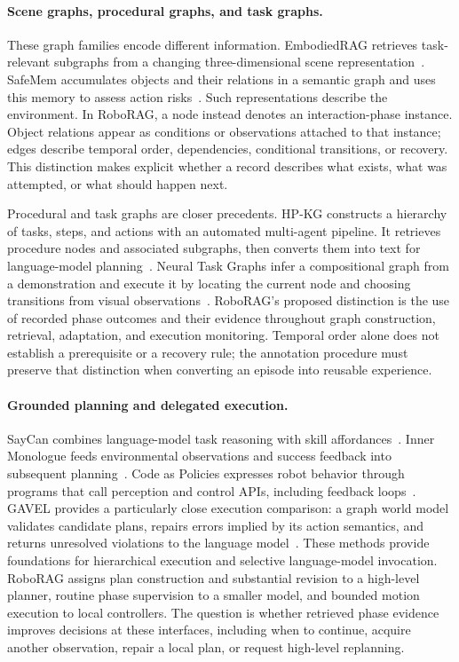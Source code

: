 \paragraph{Scene graphs, procedural graphs, and task graphs.}
These graph families encode different information. EmbodiedRAG retrieves task-relevant subgraphs from a changing three-dimensional scene representation~\cite{embodiedrag2024}. SafeMem accumulates objects and their relations in a semantic graph and uses this memory to assess action risks~\cite{safemem2026}. Such representations describe the environment. In RoboRAG, a node instead denotes an interaction-phase instance. Object relations appear as conditions or observations attached to that instance; edges describe temporal order, dependencies, conditional transitions, or recovery. This distinction makes explicit whether a record describes what exists, what was attempted, or what should happen next.

Procedural and task graphs are closer precedents. HP-KG constructs a hierarchy of tasks, steps, and actions with an automated multi-agent pipeline. It retrieves procedure nodes and associated subgraphs, then converts them into text for language-model planning~\cite{hpkg2025}. Neural Task Graphs infer a compositional graph from a demonstration and execute it by locating the current node and choosing transitions from visual observations~\cite{ntg2019}. RoboRAG's proposed distinction is the use of recorded phase outcomes and their evidence throughout graph construction, retrieval, adaptation, and execution monitoring. Temporal order alone does not establish a prerequisite or a recovery rule; the annotation procedure must preserve that distinction when converting an episode into reusable experience.

\paragraph{Grounded planning and delegated execution.}
SayCan combines language-model task reasoning with skill affordances~\cite{saycan2022}. Inner Monologue feeds environmental observations and success feedback into subsequent planning~\cite{innermonologue2022}. Code as Policies expresses robot behavior through programs that call perception and control APIs, including feedback loops~\cite{codepolicies2022}. GAVEL provides a particularly close execution comparison: a graph world model validates candidate plans, repairs errors implied by its action semantics, and returns unresolved violations to the language model~\cite{gavel2026}. These methods provide foundations for hierarchical execution and selective language-model invocation. RoboRAG assigns plan construction and substantial revision to a high-level planner, routine phase supervision to a smaller model, and bounded motion execution to local controllers. The question is whether retrieved phase evidence improves decisions at these interfaces, including when to continue, acquire another observation, repair a local plan, or request high-level replanning.


